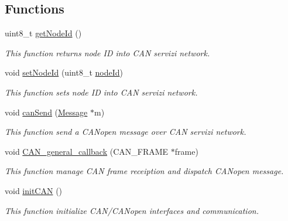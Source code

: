 \subsection*{Functions}
\begin{DoxyCompactItemize}
\item 
uint8\+\_\+t \mbox{\hyperlink{group___c_a_n__network__module_gabf47bce7c4c8d2166fe3e25ac404d7c7}{get\+Node\+Id}} ()
\begin{DoxyCompactList}\small\item\em This function returns node ID into C\+AN servizi network. \end{DoxyCompactList}\item 
void \mbox{\hyperlink{group___c_a_n__network__module_ga9c3b7582805e01be4b88b6648b42837e}{set\+Node\+Id}} (uint8\+\_\+t \mbox{\hyperlink{group___c_a_n__network__module_gafe80bdea5c10c0d32fb3261a4e513fa9}{node\+Id}})
\begin{DoxyCompactList}\small\item\em This function sets node ID into C\+AN servizi network. \end{DoxyCompactList}\item 
void \mbox{\hyperlink{group___c_a_n__network__module_ga44cc9b79c50c2c8eef6b98bac0d24dc9}{can\+Send}} (\mbox{\hyperlink{struct_message}{Message}} $\ast$m)
\begin{DoxyCompactList}\small\item\em This function send a C\+A\+Nopen message over C\+AN servizi network. \end{DoxyCompactList}\item 
void \mbox{\hyperlink{group___c_a_n__network__module_ga1b1534e44c5652543946053ad1aea5d1}{C\+A\+N\+\_\+general\+\_\+callback}} (C\+A\+N\+\_\+\+F\+R\+A\+ME $\ast$frame)
\begin{DoxyCompactList}\small\item\em This function manage C\+AN frame receiption and dispatch C\+A\+Nopen message. \end{DoxyCompactList}\item 
void \mbox{\hyperlink{group___c_a_n__network__module_gaee4f95b5d4a9e9c330f3a9169464860a}{init\+C\+AN}} ()
\begin{DoxyCompactList}\small\item\em This function initialize C\+A\+N/\+C\+A\+Nopen interfaces and communication. \end{DoxyCompactList}\end{DoxyCompactItemize}
